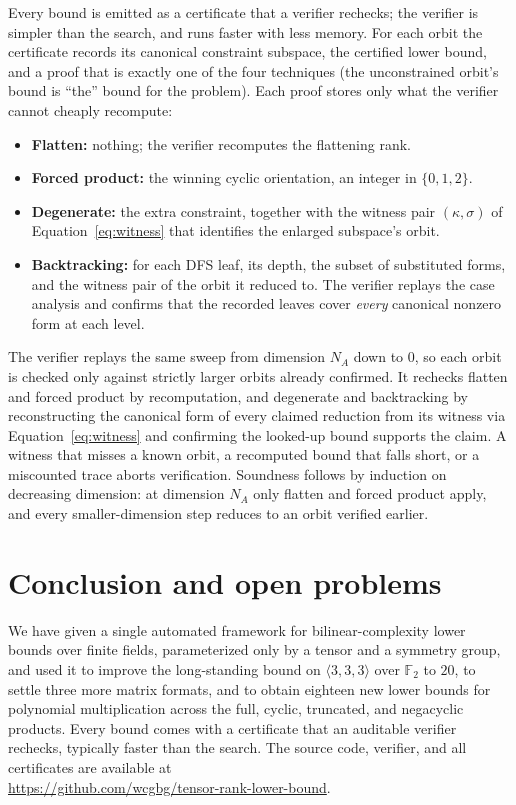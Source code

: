 \documentclass[11pt]{article}
\theoremstyle{definition}
\newcommand{\F}{\mathbb{F}}
\newcommand{\mmt}[3]{\langle #1,#2,#3\rangle}
\begin{document}
Every bound is emitted as a certificate that a verifier rechecks; the verifier is
simpler than the search, and runs faster with less memory. For each orbit the
certificate records its canonical constraint subspace, the certified lower bound, and
a proof that is exactly one of the four techniques (the unconstrained orbit's bound is
``the'' bound for the problem). Each proof stores only what the verifier cannot
cheaply recompute:
\begin{itemize}
  \item \textbf{Flatten:} nothing; the verifier recomputes the flattening rank.
  \item \textbf{Forced product:} the winning cyclic orientation, an integer in
    $\{0,1,2\}$.
  \item \textbf{Degenerate:} the extra constraint, together with the witness pair
    $(\kappa,\sigma)$ of Equation~\eqref{eq:witness} that identifies the enlarged
    subspace's orbit.
  \item \textbf{Backtracking:} for each DFS leaf, its depth, the subset of
    substituted forms, and the witness pair of the orbit it reduced to. The
    verifier replays the case analysis and confirms that the recorded leaves
    cover \emph{every} canonical nonzero form at each level.
\end{itemize}

The verifier replays the same sweep from dimension $N_A$ down to $0$, so each orbit
is checked only against strictly larger orbits already confirmed. It rechecks
flatten and forced product by recomputation, and degenerate and backtracking by
reconstructing the canonical form of every claimed reduction from its witness via
Equation~\eqref{eq:witness} and confirming the looked-up bound supports the claim. A
witness that misses a known orbit, a recomputed bound that falls short, or a
miscounted trace aborts verification. Soundness follows by induction on decreasing
dimension: at dimension $N_A$ only flatten and forced product apply, and every
smaller-dimension step reduces to an orbit verified earlier.

\section{Conclusion and open problems}\label{sec:conclusion}

We have given a single automated framework for bilinear-complexity lower bounds
over finite fields, parameterized only by a tensor and a symmetry group, and used it
to improve the long-standing bound on $\mmt{3}{3}{3}$ over $\F_2$ to $20$, to settle
three more matrix formats, and to obtain eighteen new lower bounds for polynomial
multiplication across the full, cyclic, truncated, and negacyclic products. Every
bound comes with a certificate that an auditable verifier rechecks, typically faster
than the search. The source code, verifier, and all certificates are available at \\
\url{https://github.com/wcgbg/tensor-rank-lower-bound}.
\end{document}

